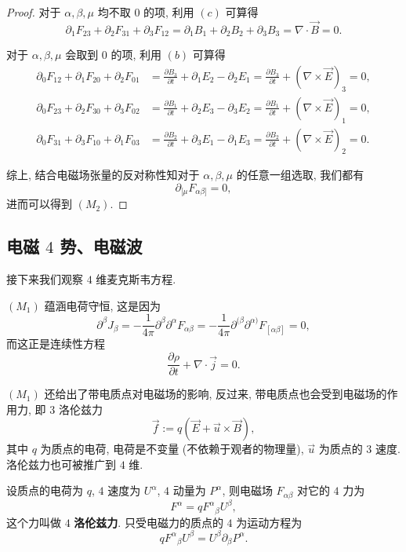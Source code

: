 \begin{proof}
    对于 $\alpha, \beta, \mu$ 均不取 $0$ 的项, 利用 $(c)$ 可算得
    \[ \partial_1F_{23}+\partial_2F_{31}+\partial_3F_{12}=\partial_1B_1+\partial_2B_2+\partial_3B_3=\nabla\cdot\vec{B}=0. \]

    对于 $\alpha, \beta, \mu$ 会取到 $0$ 的项, 利用 $(b)$ 可算得
    \begin{align*}
        \partial_0F_{12}+\partial_1F_{20}+\partial_2F_{01} &= \frac{\partial B_3}{\partial t}+\partial_1E_2-\partial_2E_1=\frac{\partial B_3}{\partial t}+(\nabla\times\vec{E})_3=0,\\
        \partial_0F_{23}+\partial_2F_{30}+\partial_3F_{02} &= \frac{\partial B_1}{\partial t}+\partial_2E_3-\partial_3E_2=\frac{\partial B_1}{\partial t}+(\nabla\times\vec{E})_1=0,\\
        \partial_0F_{31}+\partial_3F_{10}+\partial_1F_{03} &=\frac{\partial B_2}{\partial t}+\partial_3E_1-\partial_1E_3=\frac{\partial B_2}{\partial t}+(\nabla\times\vec{E})_2=0.
    \end{align*}

    综上, 结合电磁场张量的反对称性知对于 $\alpha, \beta, \mu$ 的任意一组选取, 我们都有
    \[ \partial_{[\mu}F_{\alpha\beta]}=0, \]
    进而可以得到 $(M_2)$.
\end{proof}

\subsection{电磁 \texorpdfstring{$4$}{4} 势、电磁波}
接下来我们观察 $4$ 维麦克斯韦方程.

$ (M_1) $ 蕴涵电荷守恒, 这是因为
\[ \partial^\beta J_\beta=-\frac{1}{4\pi}\partial^\beta\partial^\alpha F_{\alpha\beta}=-\frac{1}{4\pi}\partial^{(\beta}\partial^{\alpha)}F_{[\alpha\beta]}=0, \]
而这正是连续性方程
\[ \frac{\partial\rho}{\partial t}+\nabla\cdot\vec{j}=0. \]

$ (M_1) $ 还给出了带电质点对电磁场的影响, 反过来, 带电质点也会受到电磁场的作用力, 即 $ 3 $ 洛伦兹力
\[ \vec{f}:=q(\vec{E}+\vec{u}\times\vec{B}), \]
其中 $ q $ 为质点的电荷, 电荷是不变量 (不依赖于观者的物理量), $ \vec{u} $ 为质点的 $ 3 $ 速度. 洛伦兹力也可被推广到 $ 4 $ 维.
\begin{proposition}
    设质点的电荷为 $ q $, $ 4 $ 速度为 $ U^\alpha $, $ 4 $ 动量为 $ P^\alpha $, 则电磁场 $ F_{\alpha\beta} $ 对它的 $ 4 $ 力为
    \[ F^\alpha=qF^\alpha{}_\beta U^\beta, \]
    这个力叫做 $ 4 $ {\bf 洛伦兹力}. 只受电磁力的质点的 $ 4 $ 为运动方程为
    \[ qF^\alpha{}_\beta U^\beta=U^\beta\partial_\beta P^\alpha. \]
\end{proposition}

